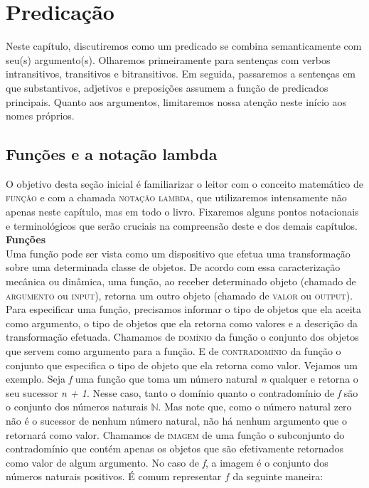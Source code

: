 
\chapter{Predicação}

Neste capítulo, discutiremos como um predicado se combina semanticamente com seu(s)
argumento(s). Olharemos primeiramente para sentenças com
verbos intransitivos, transitivos e bitransitivos. Em seguida,
passaremos a sentenças em que substantivos, adjetivos e
preposições assumem a função de predicados principais.
Quanto aos argumentos, limitaremos nossa atenção neste início
aos nomes próprios.


\section{Funções e a notação lambda}

O objetivo desta seção inicial é familiarizar o leitor com o conceito matemático de \textsc{função} e com a chamada \textsc{notação lambda}, que utilizaremos intensamente não apenas neste capítulo, mas em todo o livro. Fixaremos alguns pontos notacionais e terminológicos que serão cruciais na compreensão deste e dos demais capítulos.\\

\n \textbf{Funções} \\

\n Uma função pode ser vista como um dispositivo que efetua uma
transformação sobre uma determinada classe de objetos. De acordo
com essa caracterização mecânica ou dinâmica, uma função, ao
receber determinado objeto (chamado de \textsc{argumento} ou
\textsc{input}), retorna um outro objeto (chamado de
\textsc{valor} ou \textsc{output}). Para especificar uma função,
precisamos informar o tipo de objetos que ela aceita como
argumento, o tipo de objetos que ela retorna como valores e a
descrição da transformação efetuada. Chamamos de \textsc{domínio} da função o conjunto dos objetos que servem como argumento para a função. E de \textsc{contradomínio} da função o conjunto que especifica o
tipo de objeto que ela retorna como valor. Vejamos um exemplo. Seja \textit{f} uma
função que toma um número natural \textit{n} qualquer e retorna
o seu sucessor \textit{n + 1}. Nesse caso, tanto o domínio quanto
o contradomínio de \textit{f} são o conjunto dos números naturais
$\mathbb{N}$. Mas note que, como o número natural zero não é o
sucessor de nenhum número natural, não há nenhum argumento que o
retornará como valor. Chamamos de \textsc{imagem} de uma função o subconjunto do contradomínio que contém
apenas os objetos que são efetivamente retornados como valor de
algum argumento. No caso
de \textit{f}, a imagem é o conjunto dos números naturais
positivos. É comum representar $f$ da seguinte maneira:\\

